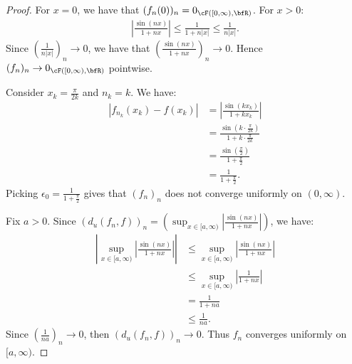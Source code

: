 \documentclass[10pt,twoside,openany]{memoir}
\begin{document}
        \begin{proof}
            For $x = 0$, we have that $(f_n(0))_n = 0_{\cF([0,\infty),\bfR)}$. For $x> 0$:
                \begin{equation*}
                \begin{split}
                    \left|\frac{\sin(nx)}{1+nx}\right| \leq \frac{1}{1 + n|x|} \leq \frac{1}{n|x|}.
                \end{split}
                \end{equation*}
            Since $\left(\frac{1}{n|x|}\right)_n \rightarrow 0$, we have that $\left(\frac{\sin(nx)}{1+nx}\right)_n \rightarrow 0$. Hence $(f_n)_n \rightarrow 0_{\cF([0,\infty),\bfR)}$ pointwise.

            Consider $x_k = \frac{\pi}{2k}$ and $n_k = k$. We have:
                \begin{equation*}
                \begin{split}
                    |f_{n_k}(x_k) - f(x_k)|
                    & = \left|\frac{\sin(k x_k)}{1 + k x_k}\right| \\
                    & = \frac{\sin \left(k \cdot \frac{\pi}{2k}\right)}{1 + k \cdot \frac{\pi}{2k}} \\
                    & = \frac{\sin \left(\frac{\pi}{2}\right)}{1 + \frac{\pi}{2}} \\
                    & = \frac{1}{1 + \frac{\pi}{2}}.
                \end{split}
                \end{equation*}
            Picking $\epsilon_0 = \frac{1}{1 + \frac{\pi}{2}}$ gives that $(f_n)_n$ does not converge uniformly on $(0,\infty)$.

            Fix $a > 0$. Since $(d_u(f_n,f))_n = \left(\sup_{x \in [a,\infty)}\left|\frac{\sin(nx)}{1+nx}\right|\right)$, we have:
                \begin{equation*}
                \begin{split}
                    \left|\sup_{x \in [a,\infty)} \left| \frac{\sin(nx)}{1+nx}\right|\right|
                    & \leq \sup_{x \in [a,\infty)}\left|\frac{\sin(nx)}{1+nx}\right| \\
                    & \leq \sup_{x \in [a,\infty)}\left|\frac{1}{1 + nx}\right| \\
                    & = \frac{1}{1 + na} \\
                    & \leq \frac{1}{na}.
                \end{split}
                \end{equation*}
            Since $\left(\frac{1}{na}\right)_n \rightarrow 0$, then $(d_u(f_n,f) )_n \rightarrow 0$. Thus $f_n$ converges uniformly on $[a,\infty)$.
        \end{proof}
\end{document}
